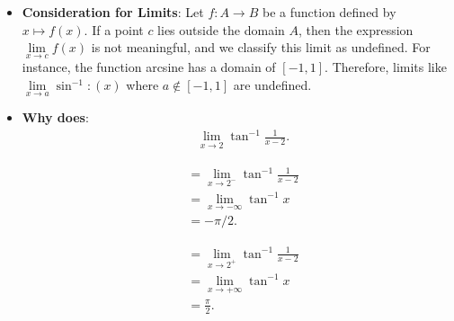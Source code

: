 \documentclass{report}
\begin{document}
\begin{itemize}
        \item \textbf{Consideration for Limits}: Let \(f: A \rightarrow B\) be a function defined by \(x \mapsto f(x)\). If a point \(c\) lies outside the domain \(A\), then the expression \(\lim\limits_{x \to c} f(x)\) is not meaningful, and we classify this limit as undefined. For instance, the function arcsine has a domain of \([-1,1]\). Therefore, limits like \(\lim\limits_{x \to a} \sin^{-1}:(x)\) where \(a \notin [-1,1]\) are undefined.
        \item \textbf{Why does}:
            \begin{align*}
            &\lim\limits_{x \to 2}{\tan^{-1}{\frac{1}{x-2}}} 
        .\end{align*}
        \begin{minipage}[]{0.47\textwidth}
            \begin{align*}
                &=\lim\limits_{x \to 2^{-}}{\tan^{-1}{\frac{1}{x-2}}} \\
                &= \lim\limits_{x \to -\infty}{\tan^{-1}{x}} \\
                &= -\pi/2
            .\end{align*}
        \end{minipage}
        \begin{minipage}[]{0.47\textwidth}
            \begin{align*}
                &=\lim\limits_{x \to 2^{+}}{\tan^{-1}{\frac{1}{x-2}}} \\
                &=\lim\limits_{x \to +\infty}{\tan^{-1}{x}} \\
                &=\frac{\pi}{2}
            .\end{align*}
        \end{minipage}
\end{itemize}
\end{document}
